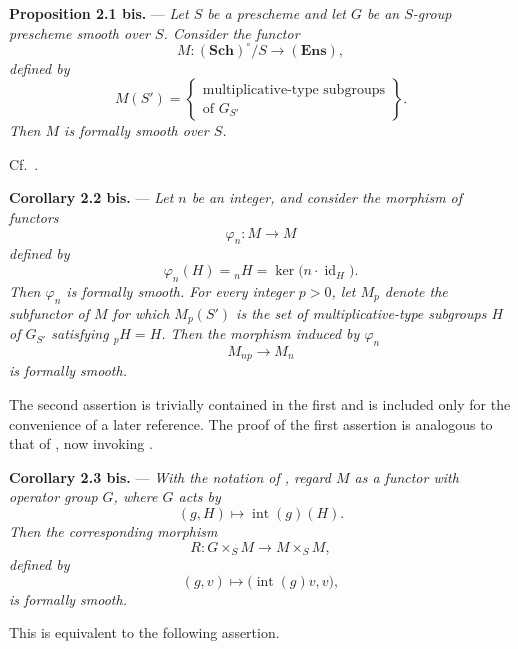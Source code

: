 \medskip
\noindent{}\textbf{Proposition 2.1 bis.} ---
\textit{Let \(S\) be a prescheme and let \(G\) be an \(S\)-group
prescheme smooth over \(S\).  Consider the functor}
\[
  M:(\mathbf{Sch})^\circ/S\longrightarrow(\mathbf{Ens}),
\]
\textit{defined by}
\[
  M(S')
  =\left\{
    \begin{array}{c}
      \text{multiplicative-type subgroups}\\[-2pt]
      \text{of \(G_{S'}\)}
    \end{array}
  \right\}.
\]
\textit{Then \(M\) is formally smooth over \(S\).}

Cf.\ .

\medskip
\noindent{}\textbf{Corollary 2.2 bis.} ---
\textit{Let \(n\) be an integer, and consider the morphism of
functors}
\[
  \varphi_n:M\longrightarrow M
\]
\textit{defined by}
\[
  \varphi_n(H)={}_nH=\ker\!\bigl(n\cdot\operatorname{id}_H\bigr).
\]
\textit{Then \(\varphi_n\) is formally smooth.  For every integer
\(p>0\), let \(M_p\) denote the subfunctor of \(M\) for which
\(M_p(S')\) is the set of multiplicative-type subgroups \(H\) of
\(G_{S'}\) satisfying \({}_pH=H\).  Then the morphism induced by
\(\varphi_n\)}
\[
  M_{np}\longrightarrow M_n
\]
\textit{is formally smooth.}

The second assertion is trivially contained in the first and is
included only for the convenience of a later reference.  The proof
of the first assertion is analogous to that of
, now invoking .

\medskip
\noindent{}\textbf{Corollary 2.3 bis.} ---
\textit{With the notation of
, regard \(M\) as a
functor with operator group \(G\), where \(G\) acts by
\[
  (g,H)\longmapsto\operatorname{int}(g)(H).
\]
Then the corresponding morphism}
\[
  R:G\times_S M\longrightarrow M\times_S M,
\]
\textit{defined by
\[
  (g,v)\longmapsto\bigl(\operatorname{int}(g)v,v\bigr),
\]
is formally smooth.}

This is equivalent to the following assertion.

